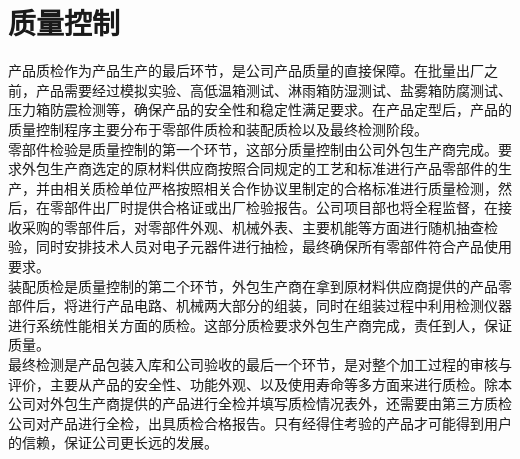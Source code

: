 \documentclass[violet]{main}
\begin{document}
		\section{质量控制}
			产品质检作为产品生产的最后环节，是公司产品质量的直接保障。在批量出厂之前，产品需要经过模拟实验、高低温箱测试、淋雨箱防湿测试、盐雾箱防腐测试、压力箱防震检测等，确保产品的安全性和稳定性满足要求。在产品定型后，产品的质量控制程序主要分布于零部件质检和装配质检以及最终检测阶段。
			\\\indent 零部件检验是质量控制的第一个环节，这部分质量控制由公司外包生产商完成。要求外包生产商选定的原材料供应商按照合同规定的工艺和标准进行产品零部件的生产，并由相关质检单位严格按照相关合作协议里制定的合格标准进行质量检测，然后，在零部件出厂时提供合格证或出厂检验报告。公司项目部也将全程监督，在接收采购的零部件后，对零部件外观、机械外表、主要机能等方面进行随机抽查检验，同时安排技术人员对电子元器件进行抽检，最终确保所有零部件符合产品使用要求。
			\\\indent 装配质检是质量控制的第二个环节，外包生产商在拿到原材料供应商提供的产品零部件后，将进行产品电路、机械两大部分的组装，同时在组装过程中利用检测仪器进行系统性能相关方面的质检。这部分质检要求外包生产商完成，责任到人，保证质量。
			\\\indent 最终检测是产品包装入库和公司验收的最后一个环节，是对整个加工过程的审核与评价，主要从产品的安全性、功能外观、以及使用寿命等多方面来进行质检。除本公司对外包生产商提供的产品进行全检并填写质检情况表外，还需要由第三方质检公司对产品进行全检，出具质检合格报告。只有经得住考验的产品才可能得到用户的信赖，保证公司更长远的发展。
\end{document}
